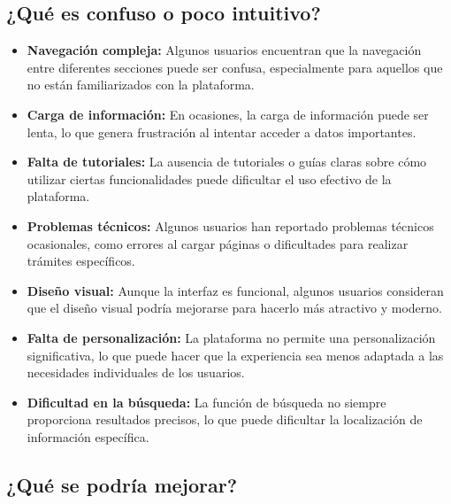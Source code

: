 \documentclass{article}
\begin{document}
\subsection{¿Qué es confuso o poco intuitivo?}
\begin{itemize}
  \item \textbf{Navegación compleja:} Algunos usuarios encuentran que la navegación entre diferentes secciones puede ser confusa, especialmente para aquellos que no están familiarizados con la plataforma.
  \item \textbf{Carga de información:} En ocasiones, la carga de información puede ser lenta, lo que genera frustración al intentar acceder a datos importantes.
  \item \textbf{Falta de tutoriales:} La ausencia de tutoriales o guías claras sobre cómo utilizar ciertas funcionalidades puede dificultar el uso efectivo de la plataforma.
  \item \textbf{Problemas técnicos:} Algunos usuarios han reportado problemas técnicos ocasionales, como errores al cargar páginas o dificultades para realizar trámites específicos.
  \item \textbf{Diseño visual:} Aunque la interfaz es funcional, algunos usuarios consideran que el diseño visual podría mejorarse para hacerlo más atractivo y moderno.
  \item \textbf{Falta de personalización:} La plataforma no permite una personalización significativa, lo que puede hacer que la experiencia sea menos adaptada a las necesidades individuales de los usuarios.
  \item \textbf{Dificultad en la búsqueda:} La función de búsqueda no siempre proporciona resultados precisos, lo que puede dificultar la localización de información específica.
\end{itemize}

\subsection{¿Qué se podría mejorar?}
\end{document}
